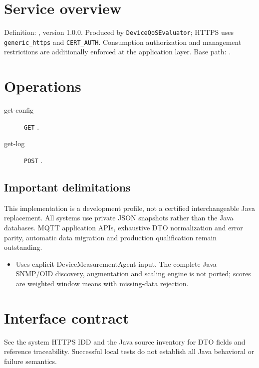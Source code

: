 \documentclass[a4paper]{arrowhead}
\begin{document}
\ArrowheadSetup
\section{Service overview}
Definition: , version 1.0.0. Produced by \texttt{DeviceQoSEvaluator}; HTTPS uses \texttt{generic\_https} and \texttt{CERT\_AUTH}. Consumption authorization and management restrictions are additionally enforced at the application layer. Base path: .
\section{Operations}
\begin{description}
\item[get-config] \texttt{GET} .
\item[get-log] \texttt{POST} .
\end{description}
\subsection{Important delimitations}
This implementation is a development profile, not a certified interchangeable Java replacement. All systems use private JSON snapshots rather than the Java databases. MQTT application APIs, exhaustive DTO normalization and error parity, automatic data migration and production qualification remain outstanding.
\begin{itemize}
\item Uses explicit DeviceMeasurementAgent input. The complete Java SNMP/OID discovery, augmentation and scaling engine is not ported; scores are weighted window means with missing-data rejection.
\end{itemize}
\section{Interface contract}
See the system HTTPS IDD and the Java source inventory for DTO fields and reference traceability. Successful local tests do not establish all Java behavioral or failure semantics.
\end{document}

